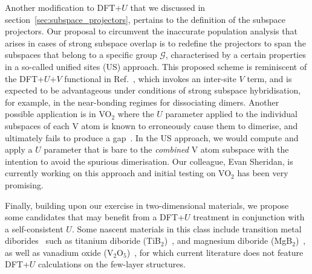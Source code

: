 Another modification to DFT+$U$ 
that we discussed in section~\ref{sec:subspace_projectors},  
pertains to the definition of the subspace projectors.
%
Our proposal to circumvent the inaccurate population 
analysis that arises in cases of strong subspace overlap 
is to redefine the projectors to span 
the subspaces that belong to a 
specific group $\mathcal{G}$, 
characterised by a certain properties 
in a so-called unified sites (US) approach.
%
This proposed scheme is reminiscent 
of the DFT+$U$+$V$ functional in Ref.~\cite{0953-8984-22-5-055602},  
which invokes an inter-site $V$ term, 
and is expected to be advantageous 
under conditions of strong subspace hybridisation, 
for example, 
in the near-bonding regimes for dissociating dimers.
% 
Another possible application is 
in VO$_2$ where the $U$ parameter applied 
to the individual subspaces of each V atom 
is known to erroneously cause them to dimerise, 
and ultimately fails to produce a gap~\cite{PhysRevLett.108.256402}.
%
In the US approach, 
we would compute and apply a $U$ parameter 
that is bare to the {\it combined} V atom subspace 
with the intention to avoid the spurious dimerisation.
%
Our colleague, Evan Sheridan, 
is currently working on this approach 
and initial testing on VO$_2$ has been very promising.


Finally, 
building upon our exercise in two-dimensional materials, 
we propose some candidates 
that may benefit from a DFT+$U$ treatment 
in conjunction with a self-consistent $U$. 
%
Some nascent materials in this class  
include transition metal diborides~\cite{ANIE:ANIE201207972,C5NR04359J}
such as titanium diboride (TiB$_2$)~\cite{PhysRevB.90.161402,doi:10.1021/acs.chemmater.7b01433,PhysRevB.93.035401}, 
and magnesium diboride (MgB$_2$)~\cite{PhysRevB.80.134113,doi:10.1063/1.4876129,doi:10.1021/acs.inorgchem.6b01685},
as well as vanadium oxide (V$_2$O$_5$)~\cite{PhysRevB.91.125116,machej1991monolayer,PhysRevB.71.165437,PhysRevB.89.045109}, 
for which current literature does 
not feature DFT+$U$ calculations 
on the few-layer structures.




